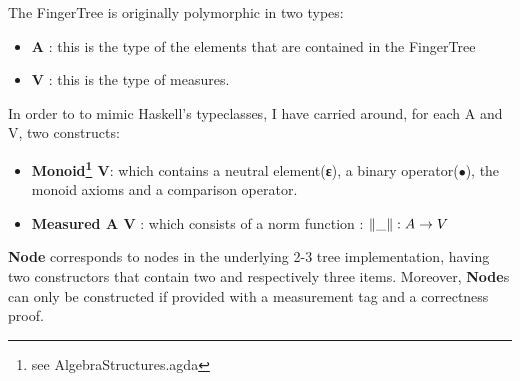 \documentclass[12pt,twoside,notitlepage]{report}
\begin{document}
The FingerTree is originally polymorphic in two types:
\begin{itemize}
\item \textbf{A} : this is the type of the elements that are contained in the FingerTree 
\item \textbf{V} : this is the type of measures. 
\end{itemize} 


In order to to mimic Haskell's typeclasses, I have carried around, for each A and V, two constructs:

\begin{itemize} 
\item \textbf{Monoid\footnote{see AlgebraStructures.agda} V}: which contains a neutral element(\textbf{ε}), a binary operator(\textbf{$∙$}), the monoid axioms and a comparison operator.
\item \textbf{Measured A V} : which consists of a norm function  :  \textbf{$\Vert\_\Vert : \nolinebreak A \rightarrow V$}
\end{itemize} 


\textbf{Node} corresponds to nodes in the underlying 2-3 tree implementation, having two constructors that contain two and respectively three items. Moreover, \textbf{Node}s can only be constructed if provided with a measurement tag and a correctness proof.
  
\end{document}

